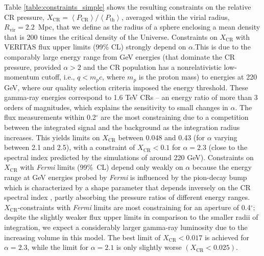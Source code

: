 \documentclass[12pt,manuscript]{aastex}
\def\Fermi{{\em Fermi}\xspace}
\newcommand{\expval}[1]{\left\langle #1 \right\rangle}
\newcommand{\rmn}{\mathrm}
\newcommand{\CR}{\mathrm{CR}}
\begin{document}
Table \ref{table:constraints_simple} shows the resulting constraints on the relative CR pressure,
$X_{\CR} = \expval{P_{\CR}}/\expval{P_\rmn{th}}$, averaged within the virial radius,
$R_\rmn{vir}=2.2$~Mpc, that we define as the radius of a sphere enclosing a mean density that is 200
times the critical density of the Universe. Constraints on $X_\CR$ with VERITAS flux upper limits
(99\% CL) strongly depend on $\alpha$.This is due to the comparably large energy range from
GeV energies (that dominate the CR pressure, provided $\alpha>2$ and the CR population has a
nonrelativistic low-momentum cutoff, i.e., $q<m_{p}c$, where $m_{p}$ is the proton mass) to
energies at 220 GeV, where our quality
selection criteria imposed the energy threshold. These gamma-ray energies correspond to 1.6 TeV
CRs -- an energy ratio of more than 3 orders of magnitudes, which explains the sensitivity to small
changes in $\alpha$. The flux measurements within 0.2$^{\circ}$ are the most constraining due to
a competition between the integrated signal and the background as the integration radius increases.
This yields limits on $X_\CR$ between 0.048 and 0.43 (for $\alpha$ varying between
2.1 and 2.5), with a constraint of $X_\CR<0.1$ for $\alpha=2.3$ (close to the spectral index
predicted by the simulations of \citet{article:PinzkePfrommer:2010} around 220 GeV). Constraints on
$X_\CR$ with \Fermi limits (99\%\ CL) depend only weakly on $\alpha$ because the energy range at GeV
energies probed by \Fermi is influenced by the pion-decay bump which is characterized by a shape
parameter that depends inversely on the CR spectral index \citep{article:PfrommerEnsslin:2004b},
partly absorbing the pressure ratios of different energy ranges. $X_\CR$-constraints with \Fermi
limits are most constraining for an aperture of 0.4$^{\circ}$; despite the slightly weaker flux
upper limits in comparison to the smaller radii of integration, we expect a considerably larger
gamma-ray luminosity due to the increasing volume in this model. The best limit of $X_\CR< 0.017$
is achieved for $\alpha=2.3$, while the limit for $\alpha=2.1$ is only slightly worse
$(X_\CR<0.025)$.

%
%
\end{document}
